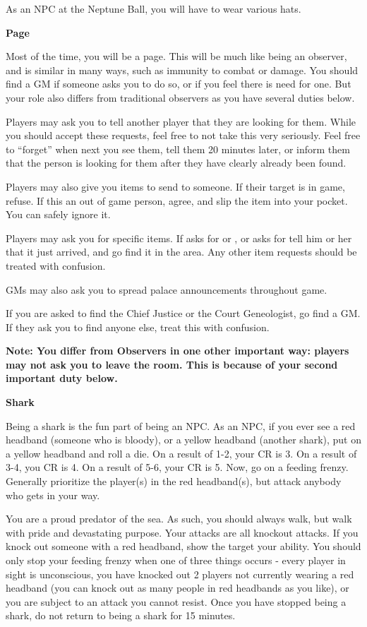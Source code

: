 \documentclass[green]{NeptuneBall}
\begin{document}
\name{\gNPC{}}

As an NPC at the Neptune Ball, you will have to wear various hats.

{\bf Page}

Most of the time, you will be a page. This will be much like being an observer, and is similar in many ways, such as immunity to combat or damage. You should find a GM if someone asks you to do so, or if you feel there is need for one. But your role also differs from traditional observers as you have several duties below.

Players may ask you to tell another player that they are looking for them. While you should accept these requests, feel free to not take this very seriously. Feel free to "`forget"' when next you see them, tell them 20 minutes later, or inform them that the person is looking for them after they have clearly already been found. 

Players may also give you items to send to someone. If their target is in game, refuse. If this an out of game person, agree, and slip the item into your pocket. You can safely ignore it.

Players may ask you for specific items. If \cPriest{} asks for \iCipherLetter{} or \iBaby{}, or \cSpy{} asks for \iScroll{} tell him or her that it just arrived, and go find it in the \pGM{} area. Any other item requests should be treated with confusion.

GMs may also ask you to spread palace announcements throughout game.

If you are asked to find the Chief Justice or the Court Geneologist, go find a GM. If they ask you to find anyone else, treat this with confusion.

{\bf Note: You differ from Observers in one other important way: players may not ask you to leave the room. This is because of your second important duty below.}

{\bf Shark}

Being a shark is the fun part of being an NPC. As an NPC, if you ever see a red headband (someone who is bloody), or a yellow headband (another shark), put on a yellow headband and roll a die. On a result of 1-2, your CR is 3. On a result of 3-4, you CR is 4. On a result of 5-6, your CR is 5. Now, go on a feeding frenzy. Generally prioritize the player(s) in the red headband(s), but attack anybody who gets in your way. 

You are a proud predator of the sea. As such, you should always walk, but walk with pride and devastating purpose. Your attacks are all knockout attacks. If you knock out someone with a red headband, show the target your \aShark{} ability. You should only stop your feeding frenzy when one of three things occurs - every player in sight is unconscious, you have knocked out 2 players not currently wearing a red headband (you can knock out as many people in red headbands as you like), or you are subject to an attack you cannot resist. Once you have stopped being a shark, do not return to being a shark for 15 minutes.
\end{document}
